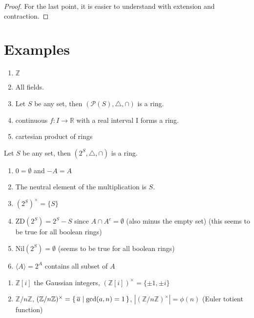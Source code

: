 \begin{proof}
    For the last point, it is easier to understand with extension and contraction.
\end{proof}

\section{Examples}

\begin{exmp}
    \begin{enumerate}
        \item \(\mathbb{Z}\)
        \item All fields.
        \item Let \(S\) be any set, then \((\mathcal{P}(S), \triangle, \cap)\) is a ring.
        \item continuous \(f: I \longrightarrow \mathbb{R}\) with a real interval I forms a ring.
        \item cartesian product of rings
    \end{enumerate}
\end{exmp}

\begin{exmp}
    Let \(S\) be any set, then \((2^S, \triangle, \cap)\) is a ring.
    \begin{enumerate}
        \item \(0 = \emptyset\) and \(-A = A\)
        \item The neutral element of the multiplication is \(S\).
        \item \((2^S)^\times = \{S\}\)
        \item \(\mathrm{ZD}(2^S) = 2^S - S\) since \(A \cap A^c = \emptyset\) (also minus the empty set) (this seems to be true for all boolean rings)
        \item \(\mathrm{Nil}(2^S) = \emptyset\) (seems to be true for all boolean rings)
        \item \(\langle A \rangle = 2^A\) contains all subset of \(A\)
    \end{enumerate}
\end{exmp}

\begin{exmp}
    \begin{enumerate}
        \item \(\mathbb{Z}[i]\) the Gaussian integers, \((\mathbb{Z}[i])^\times = {\{\pm 1, \pm i\}}\)
        \item \(\mathbb{Z}/n\mathbb{Z}\), \((\mathbb{Z}/n\mathbb{Z})^\times = \left\{\, \overline{a} \mathrel{\mid} \mathrm{gcd}(a, n)=1 \,\right\}\), \(|(\mathbb{Z}/n\mathbb{Z})^\times| = \phi(n)\) (Euler totient function)
    \end{enumerate}
\end{exmp}

